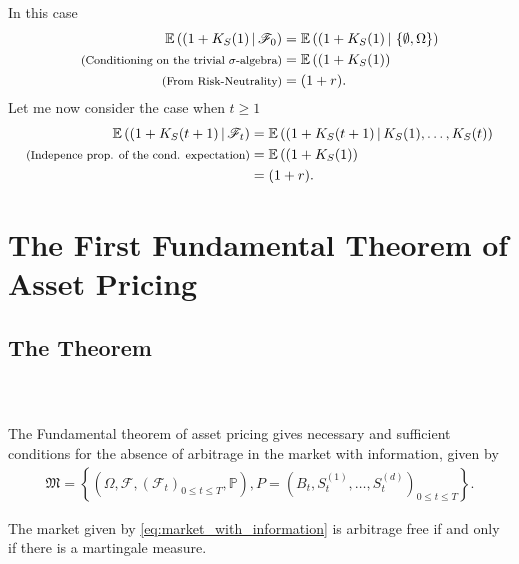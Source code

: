\documentclass{beamer}
\numberwithin{equation}{section}
\begin{document}
\begin{frame}\frametitle{{\normalsize \secname} \\ {\large \subsecname}}
    \begingroup
    \footnotesize
    In this case
    \begin{align}
        \mathbb{E}\left((1 + K_S(1)\,|\,\mathscr{F}_0\right) &= \mathbb{E}\left((1 + K_S(1)\,|\,\left\{\emptyset, \Omega\right\}\right) \\
        \text{{\footnotesize (Conditioning on the trivial $\sigma$-algebra)}} &= \mathbb{E}\left((1 + K_S(1)\right) \\
        \text{{\footnotesize (From Risk-Neutrality)}}&= (1 + r).
    \end{align}
    Let me now consider the case when $t \geq 1$
    \begin{align}
        \mathbb{E}\left((1 + K_S(t + 1)\,|\,\mathscr{F}_t\right) &= \mathbb{E}\left((1 + K_S(t + 1)\,|\,K_S(1),\ldots,K_S(t)\right) \\
        \text{{\footnotesize (Indepence prop. of the cond. expectation)}} &= \mathbb{E}\left((1 + K_S(1)\right) \\
        &= (1 + r).
    \end{align}
    \endgroup
\end{frame}

\section{The First Fundamental Theorem of Asset Pricing}

\subsection{The Theorem}

\begin{frame}\frametitle{{\normalsize \secname} \\ {\large \subsecname}}
    The Fundamental theorem of asset pricing gives necessary and sufficient conditions for the absence of arbitrage in the market with information, given by
    \begingroup
    \footnotesize
    \begin{align}\label{eq:market_with_information}
        \mathfrak{M} =
        \left\{
            \left(
                \Omega,
                \mathscr{F},
                \left(
                    \mathscr{F}_t
                \right)_{0 \leq t \leq T},
                \mathbb{P}
            \right),
            P =
            \left(
                B_t,
                S_t^{(1)},
                \ldots,
                S_t^{(d)}
            \right)_{0 \leq t \leq T}
        \right\}.
    \end{align}
    \endgroup

    \begin{theorem}[FFTAP]\label{th:fftap}
        The market given by \eqref{eq:market_with_information} is arbitrage free if and only if there is a martingale measure.
    \end{theorem}
\end{frame}
\end{document}
